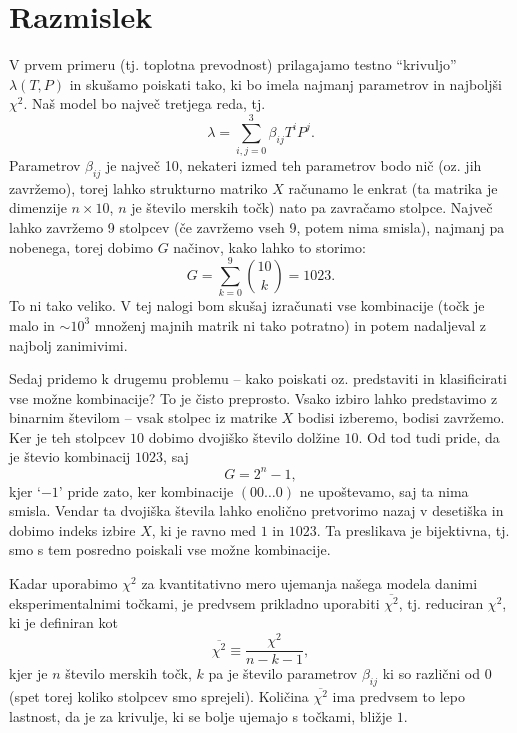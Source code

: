 \documentclass[a4 paper, 12pt]{article}
\begin{document}
\section{Razmislek}

V prvem primeru (tj. toplotna prevodnost) prilagajamo testno "`krivuljo"' $\lambda(T, P)$ in sku\v samo poiskati
tako, ki bo imela najmanj parametrov in najbolj\v si $\chi^2$. Na\v s model bo najve\v c tretjega reda, tj.
\[
	\lambda = \sum_{i,j = 0}^3 \beta_{ij} T^i P^j.
\]
Parametrov $\beta_{ij}$ je najve\v c 10, nekateri izmed teh parametrov bodo ni\v c (oz. jih zavr\v zemo), torej
lahko strukturno matriko $X$ ra\v cunamo le enkrat (ta matrika je dimenzije $n \times 10$, $n$ je \v stevilo merskih
to\v ck) nato pa zavra\v camo stolpce. Najve\v c lahko zavr\v zemo 9 stolpcev (\v ce zavr\v zemo vseh 9, potem
nima smisla), najmanj pa nobenega, torej dobimo $G$ na\v cinov, kako lahko to storimo:
\[
	G = \sum_{k = 0}^{9} \binom{10}{k} = 1023.
\]
To ni tako veliko. V tej nalogi bom sku\v saj izra\v cunati vse kombinacije (to\v ck je malo in $\sim 10^3$ mno\v zenj
majnih matrik ni tako potratno) in potem nadaljeval z najbolj zanimivimi.

Sedaj pridemo k drugemu problemu -- kako poiskati oz. predstaviti in klasificirati vse mo\v zne kombinacije? To je
\v cisto preprosto. Vsako izbiro lahko predstavimo z binarnim \v stevilom -- vsak stolpec iz matrike $X$ bodisi izberemo,
bodisi zavr\v zemo. Ker je teh stolpcev $10$ dobimo dvoji\v sko \v stevilo dol\v zine $10$. Od tod tudi pride, da je
\v stevio kombinacij $1023$, saj
\[
	G = 2^n - 1,
\]
kjer `$-1$' pride zato, ker kombinacije $(00\ldots0)$ ne upo\v stevamo, saj ta nima smisla. Vendar ta
dvoji\v ska \v stevila lahko enoli\v cno pretvorimo nazaj v deseti\v ska in dobimo indeks izbire $X$, ki je ravno med $1$
in $1023$. Ta preslikava je bijektivna, tj. smo s tem posredno poiskali vse mo\v zne kombinacije.

Kadar uporabimo $\chi^2$ za kvantitativno mero ujemanja na\v sega modela danimi eksperimentalnimi to\v ckami, je predvsem
prikladno uporabiti $\overline{\chi^2}$, tj. reduciran $\chi^2$, ki je definiran kot
\begin{equation}
	\overline{\chi^2} \equiv \frac{\chi^2}{n - k - 1},
\end{equation}
kjer je $n$ \v stevilo merskih to\v ck, $k$ pa je \v stevilo parametrov $\beta_{ij}$ ki so razli\v cni od $0$ (spet torej
koliko stolpcev smo sprejeli). Koli\v cina $\overline{\chi^2}$ ima predvsem to lepo lastnost, da je za krivulje, ki se
bolje ujemajo s to\v ckami, bli\v zje $1$.
\end{document}
